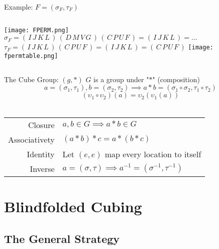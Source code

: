\documentclass{beamer}
\begin{document}
				\begin{frame}{Example: \( F = (\sigma_F ,\tau_F) \)}
					\begin{columns}[c]
						\texttt{[image: FPERM.png]} \\
						\( \sigma_F \scriptstyle = (\,I\,J\,K\,L\,)\,(\,D\,M\,V\,G\,)\,(\,C\,P\,U\,F\,) = (\,I\,J\,K\,L\,) = \dots \) \\
						\( \tau_F \scriptstyle = (\,I\,J\,K\,L\,)\,(\,C\,P\,U\,F\,) = (\,I\,J\,K\,L\,) = (\,C\,P\,U\,F\,) \)
						\texttt{[image: fpermtable.png]}
					\end{columns}
				\end{frame}
	
				\begin{frame}{The Cube Group: \( (g,*) \)}
					\(G\) is a group under "\(*\)" (composition)
					\[ a = (\sigma_1,\tau_1), b = (\sigma_2,\tau_2) \implies a*b = (\sigma_1 \circ \sigma_2, \tau_1 \circ \tau_2) \]
					\[ (\upsilon_{1} \circ \upsilon_{2}) (a) = \upsilon_{2} (\upsilon_{1} (a))\] \\
					\begin{table}
						\centering
						\begin{tabular}{r|p{7cm}}
							Closure & \( a,b \in G \implies a*b \in G \) \\[.3cm]
							Associativety & \( (a*b)*c = a*(b*c) \) \\[.3cm]
							Identity & Let \((e,e)\) map every location to itself \\[.3cm]
							Inverse & \(a = (\sigma, \tau) \implies a^{-1} = (\sigma^{-1}, \tau^{-1}) \) \\
						\end{tabular}
					\end{table}
				\end{frame}

		\section{Blindfolded Cubing}

			\subsection{The General Strategy}
		
\end{document}
